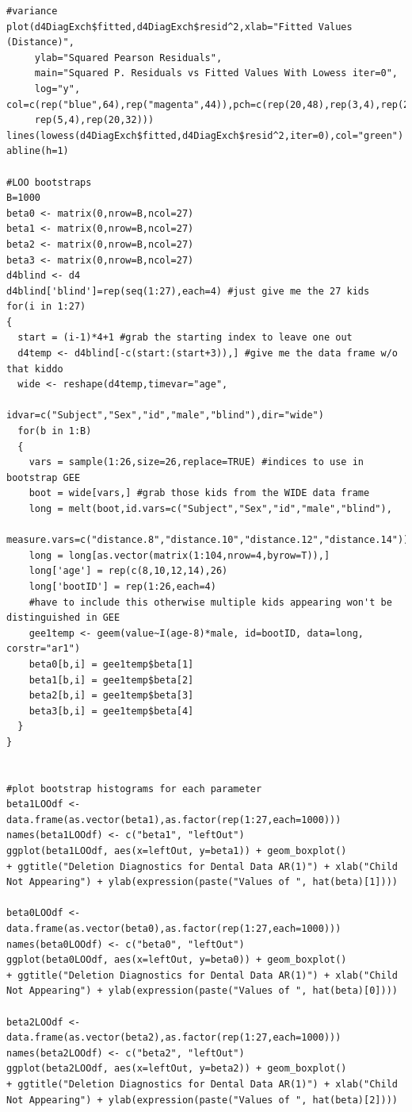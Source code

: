 \documentclass[11pt]{article}
\begin{document}
\begin{verbatim}
#variance
plot(d4DiagExch$fitted,d4DiagExch$resid^2,xlab="Fitted Values (Distance)",
     ylab="Squared Pearson Residuals", 
     main="Squared P. Residuals vs Fitted Values With Lowess iter=0",
     log="y", col=c(rep("blue",64),rep("magenta",44)),pch=c(rep(20,48),rep(3,4),rep(20,12),rep(20,8),
     rep(5,4),rep(20,32)))
lines(lowess(d4DiagExch$fitted,d4DiagExch$resid^2,iter=0),col="green")
abline(h=1)

#LOO bootstraps
B=1000
beta0 <- matrix(0,nrow=B,ncol=27)
beta1 <- matrix(0,nrow=B,ncol=27)
beta2 <- matrix(0,nrow=B,ncol=27)
beta3 <- matrix(0,nrow=B,ncol=27)
d4blind <- d4
d4blind['blind']=rep(seq(1:27),each=4) #just give me the 27 kids
for(i in 1:27)
{
  start = (i-1)*4+1 #grab the starting index to leave one out
  d4temp <- d4blind[-c(start:(start+3)),] #give me the data frame w/o that kiddo
  wide <- reshape(d4temp,timevar="age",
                  idvar=c("Subject","Sex","id","male","blind"),dir="wide")
  for(b in 1:B)
  {
    vars = sample(1:26,size=26,replace=TRUE) #indices to use in bootstrap GEE
    boot = wide[vars,] #grab those kids from the WIDE data frame
    long = melt(boot,id.vars=c("Subject","Sex","id","male","blind"),
         measure.vars=c("distance.8","distance.10","distance.12","distance.14"))
    long = long[as.vector(matrix(1:104,nrow=4,byrow=T)),]
    long['age'] = rep(c(8,10,12,14),26)
    long['bootID'] = rep(1:26,each=4) 
    #have to include this otherwise multiple kids appearing won't be distinguished in GEE
    gee1temp <- geem(value~I(age-8)*male, id=bootID, data=long, corstr="ar1")
    beta0[b,i] = gee1temp$beta[1]
    beta1[b,i] = gee1temp$beta[2]
    beta2[b,i] = gee1temp$beta[3]
    beta3[b,i] = gee1temp$beta[4]
  }
}


#plot bootstrap histograms for each parameter
beta1LOOdf <- data.frame(as.vector(beta1),as.factor(rep(1:27,each=1000)))
names(beta1LOOdf) <- c("beta1", "leftOut")
ggplot(beta1LOOdf, aes(x=leftOut, y=beta1)) + geom_boxplot() 
+ ggtitle("Deletion Diagnostics for Dental Data AR(1)") + xlab("Child Not Appearing") + ylab(expression(paste("Values of ", hat(beta)[1])))

beta0LOOdf <- data.frame(as.vector(beta0),as.factor(rep(1:27,each=1000)))
names(beta0LOOdf) <- c("beta0", "leftOut")
ggplot(beta0LOOdf, aes(x=leftOut, y=beta0)) + geom_boxplot() 
+ ggtitle("Deletion Diagnostics for Dental Data AR(1)") + xlab("Child Not Appearing") + ylab(expression(paste("Values of ", hat(beta)[0])))

beta2LOOdf <- data.frame(as.vector(beta2),as.factor(rep(1:27,each=1000)))
names(beta2LOOdf) <- c("beta2", "leftOut")
ggplot(beta2LOOdf, aes(x=leftOut, y=beta2)) + geom_boxplot() 
+ ggtitle("Deletion Diagnostics for Dental Data AR(1)") + xlab("Child Not Appearing") + ylab(expression(paste("Values of ", hat(beta)[2])))


\end{verbatim}
\end{document}

